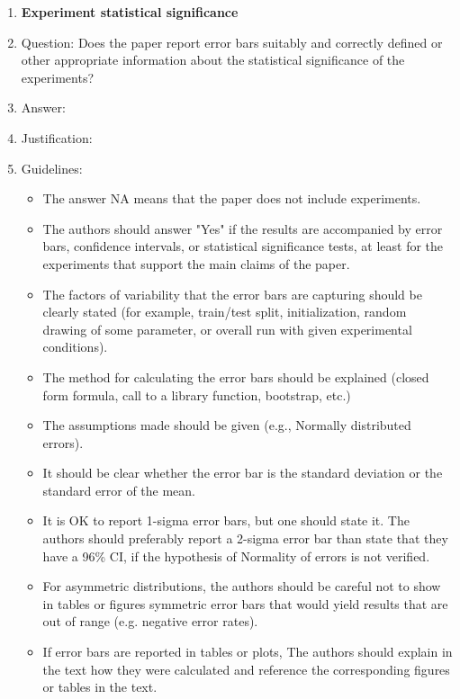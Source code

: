 \documentclass{article}
\begin{document}
\begin{enumerate}
\item {\bf Experiment statistical significance}
    \item[] Question: Does the paper report error bars suitably and correctly defined or other appropriate information about the statistical significance of the experiments?
    \item[] Answer: \answerTODO{} %
    \item[] Justification: \justificationTODO{}
    \item[] Guidelines:
    \begin{itemize}
        \item The answer NA means that the paper does not include experiments.
        \item The authors should answer "Yes" if the results are accompanied by error bars, confidence intervals, or statistical significance tests, at least for the experiments that support the main claims of the paper.
        \item The factors of variability that the error bars are capturing should be clearly stated (for example, train/test split, initialization, random drawing of some parameter, or overall run with given experimental conditions).
        \item The method for calculating the error bars should be explained (closed form formula, call to a library function, bootstrap, etc.)
        \item The assumptions made should be given (e.g., Normally distributed errors).
        \item It should be clear whether the error bar is the standard deviation or the standard error of the mean.
        \item It is OK to report 1-sigma error bars, but one should state it. The authors should preferably report a 2-sigma error bar than state that they have a 96\% CI, if the hypothesis of Normality of errors is not verified.
        \item For asymmetric distributions, the authors should be careful not to show in tables or figures symmetric error bars that would yield results that are out of range (e.g. negative error rates).
        \item If error bars are reported in tables or plots, The authors should explain in the text how they were calculated and reference the corresponding figures or tables in the text.
    \end{itemize}


\end{enumerate}
\end{document}
